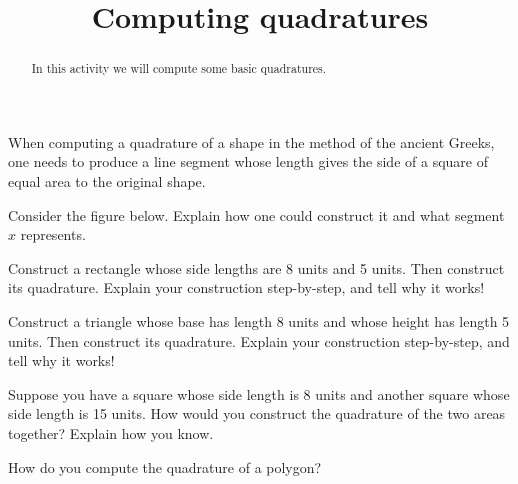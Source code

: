 \documentclass[handout]{ximera}
\title{Computing quadratures}
\begin{document}
\begin{abstract}
In this activity we will compute some basic quadratures.
\end{abstract}
\maketitle


When computing a quadrature of a shape in the method of the ancient
Greeks, one needs to produce a line segment whose length gives the
side of a square of equal area to the original shape.


\begin{question}
Consider the figure below. Explain how one could construct it and
what segment $x$ represents.
\begin{image}
\end{image}
\end{question}


\begin{question}
Construct a rectangle whose side lengths are 8 units and 5 units.  Then construct its quadrature.  Explain your construction step-by-step, and tell why it works!
\end{question}

\begin{question}
Construct a triangle whose base has length 8 units and whose height has length 5 units.  Then construct its quadrature.  Explain your construction step-by-step, and tell why it works!
\end{question}


\begin{question}
Suppose you have a square whose side length is 8 units and another square whose side length is 15 units.  How would you construct the quadrature of the two areas together?  Explain how you know.
\end{question}


\begin{question}
How do you compute the quadrature of a polygon?
\end{question}
\end{document}
